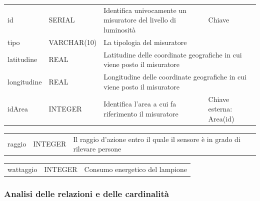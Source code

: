 \begin{center}
    \begin{tabularx}{\textwidth}{|l|l|l|X|}
        \hline
        \rowcolor{gray!30}
        \multicolumn{4}{|c|}{\textbf{MISURATORE}}\\
        \hline
        id & SERIAL & Identifica univocamente un misuratore del livello di luminosità & Chiave\\
        \hline
        tipo & VARCHAR(10) & \multicolumn{2}{l|}{La tipologia del misuratore} \\
        \hline
        latitudine & REAL & \multicolumn{2}{l|}{Latitudine delle coordinate geografiche in cui viene posto il misuratore} \\
        \hline
        longitudine & REAL & \multicolumn{2}{l|}{Longitudine delle coordinate geografiche in cui viene posto il misuratore} \\
        \hline
        idArea & INTEGER & Identifica l'area a cui fa riferimento il misuratore & Chiave esterna: Area(id)\\
        \hline
    \end{tabularx}
\end{center}

\begin{center}
    \begin{tabularx}{\textwidth}{|l|l|X}
        \hline
        \rowcolor{gray!30}
        \multicolumn{3}{|c|}{\textbf{SENSORE}}\\
        \hline
        raggio & INTEGER & Il raggio d'azione entro il quale il sensore è in grado di rilevare persone \\
        \hline
    \end{tabularx}
\end{center}

\begin{center}
    \begin{tabularx}{\textwidth}{|l|l|X|}
        \hline
        \rowcolor{gray!30}
        \multicolumn{3}{|c|}{\textbf{LAMPIONE}}\\
        \hline
        wattaggio & INTEGER & Consumo energetico del lampione \\
        \hline
    \end{tabularx}
\end{center}

\subsubsection{Analisi delle relazioni e delle cardinalità}

